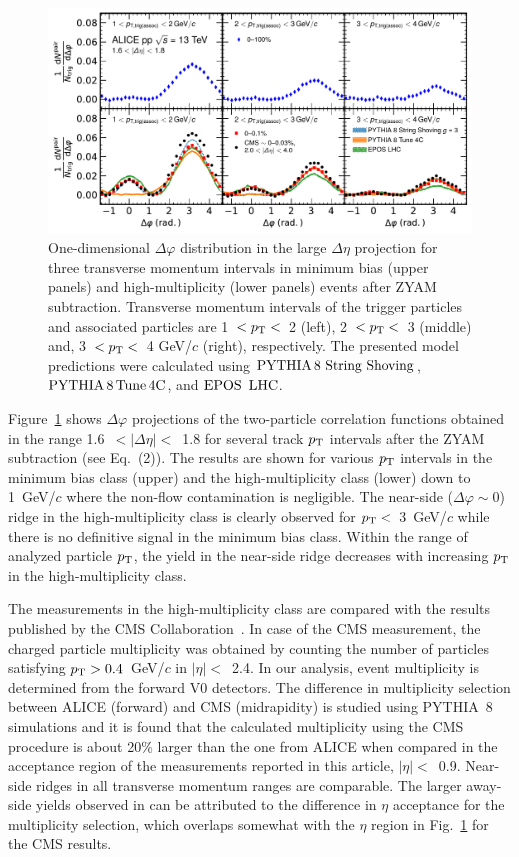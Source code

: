\begin{figure}[h!]
	\centering
	\includegraphics[width=0.9\linewidth]{./figures/Fig2_PlotDeltaPhi.pdf}
	\caption{One-dimensional $\Delta\varphi$ distribution in the large $\Delta\eta$ projection for three transverse momentum intervals in minimum bias (upper panels) and high-multiplicity (lower panels) events after ZYAM subtraction. Transverse momentum intervals of the trigger particles and associated particles are 1~$<p_\mathrm{T}<$~2 (left), 2~$<p_\mathrm{T}<$~3 (middle) and, 3~$<p_\mathrm{T}<$~4 GeV/$c$ (right), respectively. The presented model predictions were calculated using ${\mathrm{PYTHIA}\,8~\mathrm{String}~}\mathrm{Shoving}$, $\mathrm{PYTHIA}\,8\,\mathrm{Tune\,4C}$, and ${\mathrm{EPOS}\,~\mathrm{LHC}}$.}
	\label{fig:PlotDeltaPhi}
\end{figure}
 
Figure~\ref{fig:PlotDeltaPhi} shows $\Delta\varphi$ projections of the two-particle correlation functions obtained in the range 1.6~$<|\Delta \eta |<$~1.8 for several track $p_\mathrm{T}$ intervals after the ZYAM subtraction (see Eq.~(2)). The results are shown for various $\it{p}_{\rm{T}}$ intervals in the minimum bias class (upper) and the high-multiplicity class (lower) down to 1~GeV/$c$ where the non-flow contamination is negligible. The near-side ($\Delta\varphi\sim 0$) ridge in the high-multiplicity class is clearly observed for $p_\mathrm{T}<$~3~GeV/$c$ while there is no definitive signal in the minimum bias class. Within the range of analyzed particle $p_\mathrm{T}$, the yield in the near-side ridge decreases with increasing $p_\mathrm{T}$ in the high-multiplicity class.

The measurements in the high-multiplicity class are compared with the results published by the CMS Collaboration~\cite{Khachatryan:2015lva}. In case of the CMS measurement, the charged particle multiplicity was obtained by counting the number of particles satisfying $p_\mathrm{T}>0.4$~GeV/$c$ in $|\eta|<$~2.4. In our analysis, event multiplicity is determined from the forward V0 detectors. The difference in multiplicity selection between ALICE (forward) and CMS (midrapidity) is studied using PYTHIA~8 simulations and it is found that the calculated multiplicity using the CMS procedure is about 20\% larger than the one from ALICE when compared in the acceptance region of the measurements reported in this article, $|\eta|<$~0.9. Near-side ridges in all transverse momentum ranges are comparable. The larger away-side yields observed in \cite{Khachatryan:2015lva} can be attributed to the difference in $\eta$ acceptance for the multiplicity selection, which overlaps somewhat with the $\eta$ region in Fig.~\ref{fig:PlotDeltaPhi} for the CMS results.

